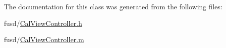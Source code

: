 \-The documentation for this class was generated from the following files\-:\begin{DoxyCompactItemize}
\item 
fusd/\hyperlink{_cal_view_controller_8h}{\-Cal\-View\-Controller.\-h}\item 
fusd/\hyperlink{_cal_view_controller_8m}{\-Cal\-View\-Controller.\-m}\end{DoxyCompactItemize}
